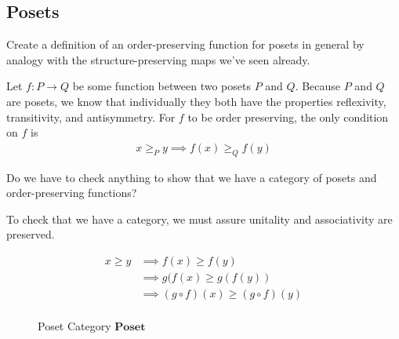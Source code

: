 \subsection{Posets}
\begin{ttta}
Create a definition of an order-preserving function for posets in general by
analogy with the structure-preserving maps we've seen already.
\end{ttta}
\begin{proofitem}
\item Let $f:P\rightarrow Q$ be some function between two posets $P$ and $Q$.
    Because $P$ and $Q$ are posets, we know that individually they both have the
    properties reflexivity, transitivity, and antisymmetry. For $f$ to be order
    preserving, the only condition on $f$ is
\begin{align*}
    x\geq_P y \implies f(x)\geq_Q f(y)
\end{align*}
\end{proofitem}

\begin{ttta}
Do we have to check anything to show that we have a category of posets and order-preserving functions?
\end{ttta}
\begin{proofitem}
    \item To check that we have a category, we must assure unitality and
        associativity are preserved.
\end{proofitem}
\begin{align*}
    x \geq y &\implies f(x) \geq f(y) \\
             &\implies g(f(x) \geq g(f(y)) \\
             &\implies (g\circ f)(x) \geq (g\circ f)(y) \\
\end{align*}
\begin{figure}[H]
    \begin{center}

\end{center}
\caption{Poset Category $\mathbf{Poset}$}
\end{figure}

